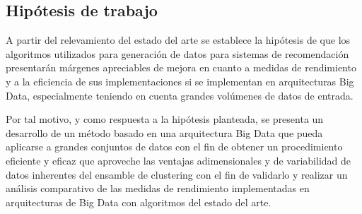 \subsection{Hipótesis de trabajo}
A partir del relevamiento del estado del arte se establece la hipótesis de que los algoritmos utilizados para generación de datos para sistemas de recomendación presentarán márgenes apreciables de mejora en cuanto a medidas de rendimiento y a la eficiencia de sus implementaciones si se implementan en arquitecturas Big Data, especialmente teniendo en cuenta grandes volúmenes de datos de entrada.

\bigskip Por tal motivo, y como respuesta a la hipótesis planteada, se presenta un desarrollo de un método basado en una arquitectura Big Data que pueda aplicarse a grandes conjuntos de datos con el fin de obtener un procedimiento eficiente y eficaz que aproveche las ventajas adimensionales y de variabilidad de datos inherentes del ensamble de clustering con el fin de validarlo y realizar un análisis comparativo de las medidas de rendimiento implementadas en arquitecturas de Big Data con algoritmos del estado del arte.